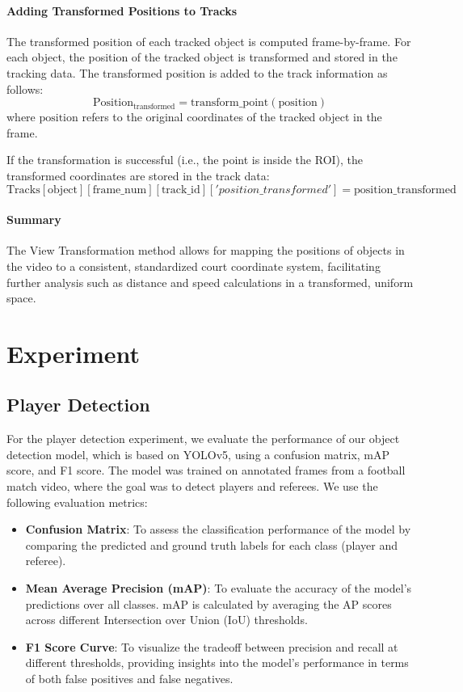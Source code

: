 \paragraph{Adding Transformed Positions to Tracks}
The transformed position of each tracked object is computed frame-by-frame. For each object, the position of the tracked object is transformed and stored in the tracking data. The transformed position is added to the track information as follows:
\begin{equation}
    \text{Position}_{\text{transformed}} = \text{transform\_point}(\text{position})
\end{equation}
where \(\text{position}\) refers to the original coordinates of the tracked object in the frame.

If the transformation is successful (i.e., the point is inside the ROI), the transformed coordinates are stored in the track data:
\begin{equation}
    \text{Tracks}[\text{object}][\text{frame\_num}][\text{track\_id}]['position\_transformed'] = \text{position\_transformed}
\end{equation}

\paragraph{Summary}
The View Transformation method allows for mapping the positions of objects in the video to a consistent, standardized court coordinate system, facilitating further analysis such as distance and speed calculations in a transformed, uniform space.


\section{Experiment}

\subsection{Player Detection}

For the player detection experiment, we evaluate the performance of our object detection model, which is based on YOLOv5, using a confusion matrix, mAP score, and F1 score. The model was trained on annotated frames from a football match video, where the goal was to detect players and referees. We use the following evaluation metrics:

\begin{itemize}
    \item \textbf{Confusion Matrix}: To assess the classification performance of the model by comparing the predicted and ground truth labels for each class (player and referee).
    \item \textbf{Mean Average Precision (mAP)}: To evaluate the accuracy of the model’s predictions over all classes. mAP is calculated by averaging the AP scores across different Intersection over Union (IoU) thresholds.
    \item \textbf{F1 Score Curve}: To visualize the tradeoff between precision and recall at different thresholds, providing insights into the model’s performance in terms of both false positives and false negatives.
\end{itemize}

